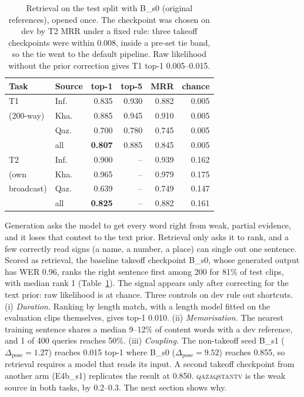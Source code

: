 \documentclass[11pt,twocolumn,a4paper]{article}
\newcommand{\cpl}{\Delta_{\text{pose}}}
\newcommand{\src}[1]{\textsc{#1}}
\newcommand{\qz}{\src{qazaqstantv}}
\begin{document}
\begin{table}[t]
\centering\small
\setlength{\tabcolsep}{2.5pt}
\begin{tabular}{llrrrr}
\toprule
Task & Source & top-1 & top-5 & MRR & chance \\
\midrule
T1 & Inf. & 0.835 & 0.930 & 0.882 & 0.005 \\
(200-way) & Kha. & 0.885 & 0.945 & 0.910 & 0.005 \\
 & Qaz. & 0.700 & 0.780 & 0.745 & 0.005 \\
 & all & \textbf{0.807} & 0.885 & 0.845 & 0.005 \\
\midrule
T2 & Inf. & 0.900 & -- & 0.939 & 0.162 \\
(own & Kha. & 0.965 & -- & 0.979 & 0.175 \\
broadcast) & Qaz. & 0.639 & -- & 0.749 & 0.147 \\
 & all & \textbf{0.825} & -- & 0.882 & 0.161 \\
\bottomrule
\end{tabular}
\caption{Retrieval on the test split with B\_s0 (original references), opened once. The checkpoint was chosen on dev by T2 MRR under a fixed rule: three takeoff checkpoints were within 0.008, inside a pre-set tie band, so the tie went to the default pipeline. Raw likelihood without the prior correction gives T1 top-1 0.005--0.015.}
\label{tab:retrieval}
\end{table}

Generation asks the model to get every word right from weak, partial evidence, and it loses that contest to the text prior. Retrieval only asks it to rank, and a few correctly read signs (a name, a number, a place) can single out one sentence. Scored as retrieval, the baseline takeoff checkpoint B\_s0, whose generated output has WER 0.96, ranks the right sentence first among 200 for 81\% of test clips, with median rank 1 (Table~\ref{tab:retrieval}). The signal appears only after correcting for the text prior: raw likelihood is at chance. Three controls on dev rule out shortcuts.
(i) \emph{Duration.} Ranking by length match, with a length model fitted on the evaluation clips themselves, gives top-1 0.010.
(ii) \emph{Memorisation.} The nearest training sentence shares a median 9--12\% of content words with a dev reference, and 1 of 400 queries reaches 50\%.
(iii) \emph{Coupling.} The non-takeoff seed B\_s1 ($\cpl=1.27$) reaches 0.015 top-1 where B\_s0 ($\cpl=9.52$) reaches 0.855, so retrieval requires a model that reads its input.
A second takeoff checkpoint from another arm (E4b\_s1) replicates the result at 0.850. \qz{} is the weak source in both tasks, by 0.2--0.3. The next section shows why.
\end{document}
